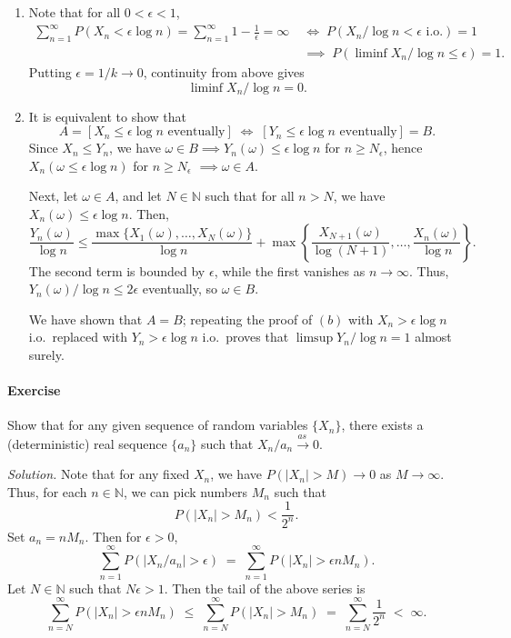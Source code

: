 \documentclass[10pt]{article}
\newcounter{prob}
\newcommand{\problem}{\stepcounter{prob}\paragraph{Exercise \arabic{prob}}}
\newcommand{\solution}{\textit{Solution.} }
\newcommand{\N}{\mathbb{N}}
\newcommand{\toas}{\overset{as\,}{\longrightarrow}}
\newcommand{\io}{\text{ i.o.}}
\begin{document}
\begin{enumerate}
        \item Note that for all $0 < \epsilon < 1$, \begin{align*}
            \sum_{n = 1}^\infty P(X_n < \epsilon \log{n}) = \sum_{n = 1}^\infty 1 -
            \frac{1}{\epsilon} = \infty
            \;&\iff\; P(X_n / \log{n} < \epsilon \io) = 1 \\
            \;&\implies\; P(\liminf X_n/\log{n} \leq \epsilon) = 1.
        \end{align*}
        Putting $\epsilon = 1/k \to 0$, continuity from above gives \[
            \liminf X_n/\log{n} = 0.
        \]

        \item It is equivalent to show that \[
            A = [X_n \leq \epsilon\log{n}\text{ eventually}] \;\iff\; [Y_n \leq
            \epsilon\log{n}\text{ eventually}] = B.
        \] Since $X_n \leq Y_n$, we have $\omega \in B \implies Y_n(\omega) \leq
        \epsilon \log{n}$ for $n \geq N_\epsilon$, hence $X_n(\omega \leq
        \epsilon \log{n})$ for $n \geq N_\epsilon$ $\implies \omega \in A$.

        Next, let $\omega \in A$, and let $N \in \N$ such that for all $n > N$, we
        have $X_n(\omega) \leq \epsilon \log{n}$. Then, \[
            \frac{Y_n(\omega)}{\log{n}} \leq \frac{\max\{X_1(\omega), \dots,
            X_N(\omega)\}}{\log{n}} + \max\left\{\frac{X_{N + 1}(\omega)}{\log(N + 1)},
            \dots, \frac{X_n(\omega)}{\log{n}}\right\}.
        \] The second term is bounded by $\epsilon$, while the first vanishes as $n
        \to \infty$. Thus, $Y_n(\omega)/\log{n} \leq 2\epsilon$ eventually, so
        $\omega \in B$.

        We have shown that $A = B$; repeating the proof of $(b)$ with $X_n > \epsilon
        \log{n}$ i.o.\ replaced with $Y_n > \epsilon \log{n}$ i.o.\ proves that
        $\limsup Y_n/\log{n} = 1$ almost surely.
    \end{enumerate}


    \problem Show that for any given sequence of random variables $\{X_n\}$, there
    exists a (deterministic) real sequence $\{a_n\}$ such that $X_n/a_n \toas 0$.

    \solution Note that for any fixed $X_n$, we have $P(|X_n| > M) \to 0$ as $M \to
    \infty$. Thus, for each $n \in \N$, we can pick numbers $M_n$ such that \[
        P(|X_n| > M_n) < \frac{1}{2^n}.
    \] Set $a_n = nM_n$. Then for $\epsilon > 0$, \[
        \sum_{n = 1}^\infty P(|X_n/a_n| > \epsilon) \;=\;
        \sum_{n = 1}^\infty P(|X_n| > \epsilon nM_n).
    \] Let $N \in \N$ such that $N\epsilon > 1$. Then the tail of the above series is
    \[
        \sum_{n = N}^\infty P(|X_n| > \epsilon nM_n) \;\leq\;
        \sum_{n = N}^\infty P(|X_n| > M_n) \;=\;
        \sum_{n = N}^\infty \frac{1}{2^n} \;<\; \infty.
    \]
\end{document}
